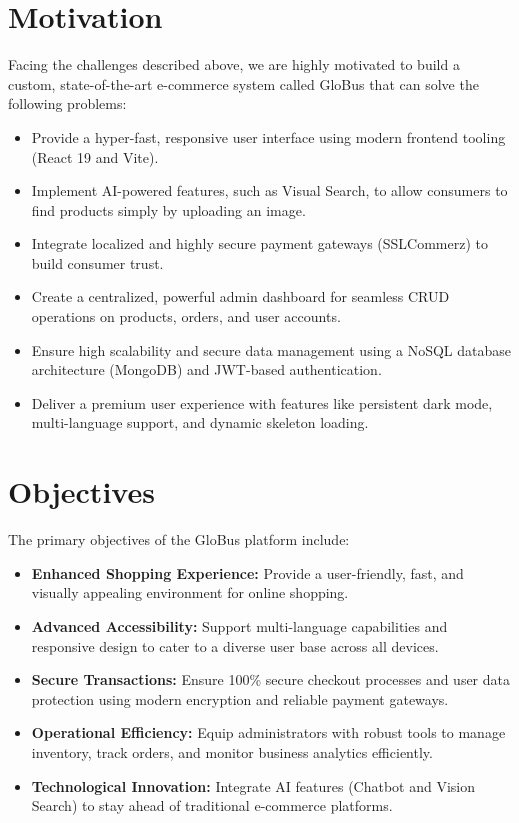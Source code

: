 \section{Motivation}
Facing the challenges described above, we are highly motivated to build a custom, state-of-the-art e-commerce system called GloBus that can solve the following problems:
\begin{itemize}
    \item Provide a hyper-fast, responsive user interface using modern frontend tooling (React 19 and Vite).
    
    \item Implement AI-powered features, such as Visual Search, to allow consumers to find products simply by uploading an image.
    
    \item Integrate localized and highly secure payment gateways (SSLCommerz) to build consumer trust.
    
    \item Create a centralized, powerful admin dashboard for seamless CRUD operations on products, orders, and user accounts.
    
    \item Ensure high scalability and secure data management using a NoSQL database architecture (MongoDB) and JWT-based authentication.
    
    \item Deliver a premium user experience with features like persistent dark mode, multi-language support, and dynamic skeleton loading.
\end{itemize}

\section{Objectives}
The primary objectives of the GloBus platform include:
\begin{itemize}
    \item \textbf{Enhanced Shopping Experience:} Provide a user-friendly, fast, and visually appealing environment for online shopping.
    
    \item \textbf{Advanced Accessibility:} Support multi-language capabilities and responsive design to cater to a diverse user base across all devices.
    
    \item \textbf{Secure Transactions:} Ensure 100\% secure checkout processes and user data protection using modern encryption and reliable payment gateways.
    
    \item \textbf{Operational Efficiency:} Equip administrators with robust tools to manage inventory, track orders, and monitor business analytics efficiently.
    
    \item \textbf{Technological Innovation:} Integrate AI features (Chatbot and Vision Search) to stay ahead of traditional e-commerce platforms.
\end{itemize}

